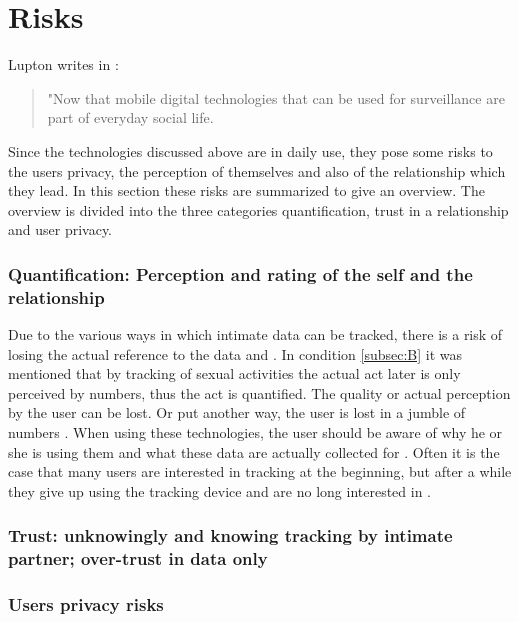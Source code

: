 \section{Risks}
Lupton writes in \cite{doi:10.1080/13691058.2014.920528}:
\begin{quote}
	"Now that mobile digital technologies that can be used for surveillance are part of everyday social life.
\end{quote}
Since the technologies discussed above are in daily use, they pose some risks to the users privacy, the perception of themselves and also of the relationship which they lead.
In this section these risks are summarized to give an overview.
The overview is divided into the three categories quantification, trust in a relationship and user privacy.

\subsubsection{Quantification: Perception and rating of the self and the relationship}
Due to the various ways in which intimate data can be tracked, there is a risk of losing the actual reference to the data \cite{doi:10.1080/13691058.2014.920528} and \cite{lupton2016quantified}. In condition \ref{subsec:B} it was mentioned that by tracking of sexual activities the actual act later is only perceived by numbers, thus the act is quantified. The quality or actual perception by the user can be lost. Or put another way, the user is lost in a jumble of numbers \cite{kelly2017inevitable}.
When using these technologies, the user should be aware of why he or she is using them and what these data are actually collected for \cite{doi:10.1080/15265161.2017.1409823}. 
Often it is the case that many users are interested in tracking at the beginning, but after a while they give up using the tracking device and are no long interested in \cite{sjoklint2015complexities}.

\subsubsection{Trust: unknowingly and knowing tracking by intimate partner; over-trust in data only}

\subsubsection{Users privacy risks}
